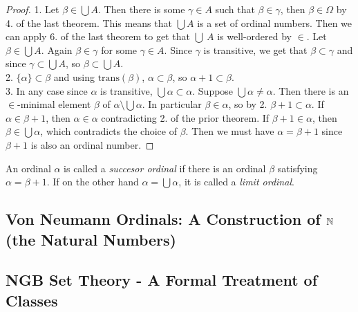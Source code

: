 \begin{proof}
    1. Let $\beta \in \bigcup A$. Then there is some $\gamma\in A$ such that $\beta \in \gamma$, then $\beta \in \Omega$ by 4. of the last theorem. This means that $\bigcup A$ is a set of ordinal numbers. Then we can apply 6. of the last theorem to get that $\bigcup \ A$ is well-ordered by $\in$. Let $\beta\in \bigcup A$. Again $\beta\in \gamma$ for some $\gamma\in A$. Since $\gamma$ is transitive, we get that $\beta\subset \gamma$ and since $\gamma\subset \bigcup A$, so $\beta \subset \bigcup A$.\\
    2. $\{\alpha\}\subset \beta$ and using $\mathrm{trans}(\beta)$, $\alpha\subset \beta$, so $\alpha+1\subset \beta$.\\
    3. In any case since $\alpha$ is transitive, $\bigcup\alpha \subset \alpha$. Suppose $\bigcup \alpha\neq \alpha$. Then there is an $\in$-minimal element $\beta$ of $\alpha\setminus \bigcup\alpha$. In particular $\beta\in \alpha$, so by 2. $\beta+1\subset \alpha$. If $\alpha\in \beta+1$, then $\alpha\in \alpha$ contradicting 2. of the prior theorem. If $\beta +1 \in \alpha$, then $\beta\in \bigcup\alpha$, which contradicts the choice of $\beta$. Then we must have $\alpha = \beta+1$ since $\beta+1$ is also an ordinal number.    
\end{proof}
\begin{definition}
    An ordinal $\alpha$ is called a \textit{succesor ordinal} if there is an ordinal $\beta$ satisfying $\alpha=\beta+1$. If on the other hand $\alpha = \bigcup \alpha$, it is called a \textit{limit ordinal}.
\end{definition}
\begin{theorem}
    
\end{theorem}
\subsection{Von Neumann Ordinals: A Construction of $\mathbb{N}$ (the Natural Numbers)}
\subsection{NGB Set Theory - A Formal Treatment of Classes}
